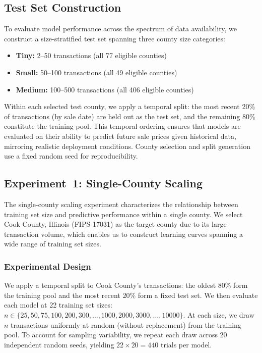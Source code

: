 \subsection{Test Set Construction}\label{sec:test_set}

To evaluate model performance across the spectrum of data availability, we construct a size-stratified test set spanning three county size categories:

\begin{itemize}
    \item \textbf{Tiny:} 2--50 transactions (all 77 eligible counties)
    \item \textbf{Small:} 50--100 transactions (all 49 eligible counties)
    \item \textbf{Medium:} 100--500 transactions (all 406 eligible counties)
\end{itemize}

Within each selected test county, we apply a temporal split: the most recent 20\% of transactions (by sale date) are held out as the test set, and the remaining 80\% constitute the training pool. This temporal ordering ensures that models are evaluated on their ability to predict future sale prices given historical data, mirroring realistic deployment conditions. County selection and split generation use a fixed random seed for reproducibility.

\subsection{Experiment~1: Single-County Scaling}\label{sec:single_county_scaling}

The single-county scaling experiment characterizes the relationship between training set size and predictive performance within a single county. We select Cook County, Illinois (FIPS 17031) as the target county due to its large transaction volume, which enables us to construct learning curves spanning a wide range of training set sizes.

\subsubsection{Experimental Design}

We apply a temporal split to Cook County's transactions: the oldest 80\% form the training pool and the most recent 20\% form a fixed test set. We then evaluate each model at 22 training set sizes: $n \in \{25, 50, 75, 100, 200, 300, \ldots, 1000, 2000, 3000, \ldots, 10000\}$. At each size, we draw $n$ transactions uniformly at random (without replacement) from the training pool. To account for sampling variability, we repeat each draw across 20 independent random seeds, yielding $22 \times 20 = 440$ trials per model.

